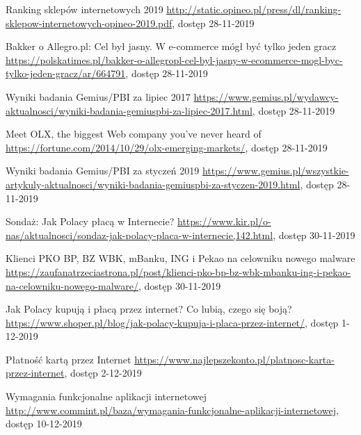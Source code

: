 \documentclass[12pt]{article}
\numberwithin{figure}{section}
\begin{document}
\begin{sloppypar}
\begin{thebibliography}{99}
    Ranking sklepów internetowych 2019
    \url{http://static.opineo.pl/press/dl/ranking-sklepow-internetowych-opineo-2019.pdf}, dostęp 28-11-2019
    
    Bakker o Allegro.pl: Cel był jasny. W e-commerce mógł być tylko jeden gracz
    \url{https://polskatimes.pl/bakker-o-allegropl-cel-byl-jasny-w-ecommerce-mogl-byc-tylko-jeden-gracz/ar/664791}, dostęp 28-11-2019
    
    Wyniki badania Gemius/PBI za lipiec 2017
    \url{https://www.gemius.pl/wydawcy-aktualnosci/wyniki-badania-gemiuspbi-za-lipiec-2017.html}, dostęp 28-11-2019
    
    Meet OLX, the biggest Web company you’ve never heard of
    \url{https://fortune.com/2014/10/29/olx-emerging-markets/}, dostęp 28-11-2019
    
    Wyniki badania Gemius/PBI za styczeń 2019
    \url{https://www.gemius.pl/wszystkie-artykuly-aktualnosci/wyniki-badania-gemiuspbi-za-styczen-2019.html}, dostęp 28-11-2019
    
    Sondaż: Jak Polacy płacą w Internecie?
    \url{https://www.kir.pl/o-nas/aktualnosci/sondaz-jak-polacy-placa-w-internecie,142.html}, dostęp 30-11-2019
    
    Klienci PKO BP, BZ WBK, mBanku, ING i Pekao na celowniku nowego malware
    \url{https://zaufanatrzeciastrona.pl/post/klienci-pko-bp-bz-wbk-mbanku-ing-i-pekao-na-celowniku-nowego-malware/}, dostęp 30-11-2019
    
    Jak Polacy kupują i płacą przez internet? Co lubią, czego się boją?
    \url{https://www.shoper.pl/blog/jak-polacy-kupuja-i-placa-przez-internet/}, dostęp 1-12-2019
    
    Płatność kartą przez Internet
    \url{https://www.najlepszekonto.pl/platnosc-karta-przez-internet}, dostęp 2-12-2019
    
    Wymagania funkcjonalne aplikacji internetowej
    \url{http://www.commint.pl/baza/wymagania-funkcjonalne-aplikacji-internetowej}, dostęp 10-12-2019
    

\end{thebibliography}
\end{sloppypar}
\end{document}

